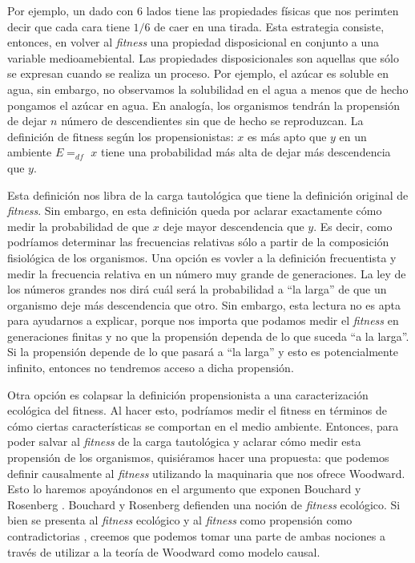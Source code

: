 Por ejemplo, un dado con 6 lados tiene las propiedades físicas que nos perimten decir que cada cara tiene $1/6$ de caer en una tirada. Esta estrategia consiste, entonces, en volver al \emph{fitness} una propiedad disposicional en conjunto a una variable medioamebiental. Las propiedades disposicionales son aquellas que sólo se expresan cuando se realiza un proceso. Por ejemplo, el azúcar es soluble en agua, sin embargo, no observamos la solubilidad en el agua a menos que de hecho pongamos el azúcar en agua. En analogía, los organismos tendrán la propensión de dejar $n$ número de descendientes sin que de hecho se reproduzcan. La definición de fitness según los propensionistas: $x$ es más apto que $y$ en un ambiente $E =_{df}$ $x$ tiene una probabilidad más alta de dejar más descendencia que $y$.

Esta definición nos libra de la carga tautológica que tiene la definición original de \emph{fitness}. Sin embargo, en esta definición queda por aclarar exactamente cómo medir la probabilidad de que $x$ deje mayor descendencia que $y$. Es decir, como podríamos determinar las frecuencias relativas sólo a partir de la composición fisiológica de los organismos. Una opción es vovler a la definición frecuentista y medir la frecuencia relativa en un número muy grande de generaciones. La ley de los números grandes nos dirá cuál será la probabilidad a ``la larga'' de que un organismo deje más descendencia que otro. Sin embargo, esta lectura no es apta para ayudarnos a explicar, porque nos importa que podamos medir el \emph{fitness} en generaciones finitas y no que la propensión dependa de lo que suceda ``a la larga''. Si la propensión depende de lo que pasará a ``la larga'' y esto es potencialmente infinito, entonces no tendremos acceso a dicha propensión.

Otra opción es colapsar la definición propensionista a una caracterización ecológica del fitness. Al hacer esto, podríamos medir el fitness en términos de cómo ciertas características se comportan en el medio ambiente. Entonces, para poder salvar al \emph{fitness} de la carga tautológica y aclarar cómo medir esta propensión de los organismos, quisiéramos hacer una propuesta: que podemos definir causalmente al \emph{fitness} utilizando la maquinaria que nos ofrece Woodward. Esto lo haremos apoyándonos en el argumento que exponen Bouchard y Rosenberg \cite{Bouchard2004}. Bouchard y Rosenberg defienden una noción de \emph{fitness} ecológico. Si bien se presenta al \emph{fitness} ecológico y al \emph{fitness} como propensión como contradictorias \cite{sep-fitness}, creemos que podemos tomar una parte de ambas nociones a través de utilizar a la teoría de Woodward como modelo causal.


